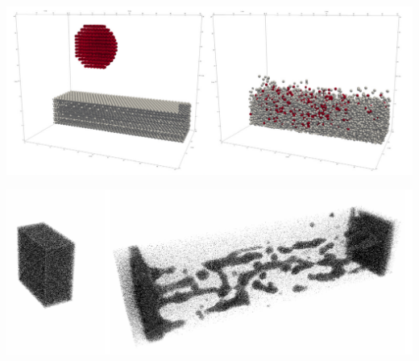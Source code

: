 

\vspace{1em} 
\vspace{1em} 
\vspace{1em} 

\noindent
\begin{minipage}[t]{0.5\textwidth} %
    \centering
    \includegraphics[width=0.9\linewidth]{imgs/fallingDrop.png} %
    \label{fig:fd}
\end{minipage}%
\begin{minipage}[t]{0.5\textwidth} %
    \centering
    \includegraphics[width=0.9\linewidth]{imgs/explodingLiquid.png} %
    \label{fig:exl}
\end{minipage}

